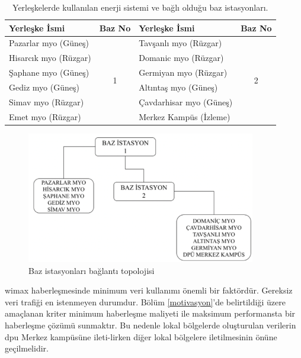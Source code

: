 \begin{table}[htbp]
\centering
\caption{Yerleşkelerde kullanılan enerji sistemi ve bağlı olduğu baz istasyonları.}
\label{tab:tablo4-6}
\begin{tabular}{|l|c|l|c|}
\hline
Yerleşke İsmi        & \multicolumn{1}{l|}{Baz No} & Yerleşke İsmi         & \multicolumn{1}{l|}{Baz No} \\ \hline
Pazarlar \gls{myo} (Güneş) & \multirow{6}{*}{1}          & Tavşanlı \gls{myo} (Rüzgar) & \multirow{6}{*}{2}          \\ \cline{1-1} \cline{3-3}
Hisarcık \gls{myo} (Rüzgar) &  & Domanic \gls{myo} (Rüzgar)    &  \\ \cline{1-1} \cline{3-3}
Şaphane \gls{myo} (Güneş)   &  & Germiyan \gls{myo} (Rüzgar)   &  \\ \cline{1-1} \cline{3-3}
Gediz \gls{myo} (Güneş)     &  & Altıntaş \gls{myo} (Güneş)    &  \\ \cline{1-1} \cline{3-3}
Simav \gls{myo} (Rüzgar)    &  & Çavdarhisar \gls{myo} (Güneş) &  \\ \cline{1-1} \cline{3-3}
Emet \gls{myo} (Rüzgar)     &  & Merkez Kampüs (İzleme)  &  \\ \hline
\end{tabular}
\end{table}


\begin{figure}[htbp]
\centerline{\includegraphics[width=10cm]{Resim/sekil4-28.png}}
\caption{Baz istasyonları bağlantı topolojisi}
\label{fig:4-29}
\end{figure}

\gls{wimax} haberleşmesinde minimum veri kullanımı önemli bir faktördür. Gereksiz veri trafiği en istenmeyen durumdur. Bölüm \ref{motivasyon}'de belirtildiği üzere amaçlanan kriter minimum haberleşme maliyeti ile maksimum performansta bir haberleşme çözümü sunmaktır. Bu nedenle lokal bölgelerde oluşturulan verilerin \gls{dpu} Merkez kampüsüne ileti-lirken diğer lokal bölgelere iletilmesinin önüne geçilmelidir. 

